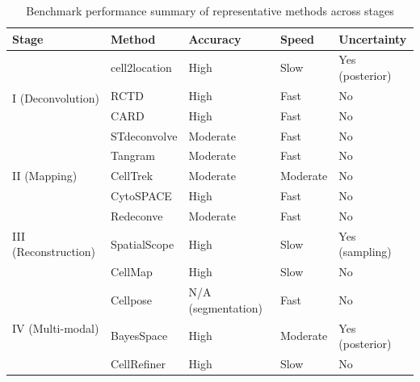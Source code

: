 \begin{table}[htbp]
\centering
\caption{Benchmark performance summary of representative methods across stages}
\label{tab:benchmark}
\begin{tabular}{@{}lllll@{}}
\toprule
\textbf{Stage} & \textbf{Method} & \textbf{Accuracy} & \textbf{Speed} & \textbf{Uncertainty} \\
\midrule
\multirow{4}{*}{I (Deconvolution)}
& cell2location & High & Slow & Yes (posterior) \\
& RCTD & High & Fast & No \\
& CARD & High & Fast & No \\
& STdeconvolve & Moderate & Fast & No \\
\midrule
\multirow{3}{*}{II (Mapping)}
& Tangram & Moderate & Fast & No \\
& CellTrek & Moderate & Moderate & No \\
& CytoSPACE & High & Fast & No \\
\midrule
\multirow{3}{*}{III (Reconstruction)}
& Redeconve & Moderate & Fast & No \\
& SpatialScope & High & Slow & Yes (sampling) \\
& CellMap & High & Slow & No \\
\midrule
\multirow{3}{*}{IV (Multi-modal)}
& Cellpose & N/A (segmentation) & Fast & No \\
& BayesSpace & High & Moderate & Yes (posterior) \\
& CellRefiner & High & Slow & No \\
\bottomrule
\end{tabular}
\end{table}
